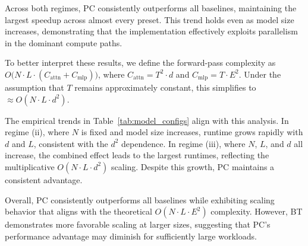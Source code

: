 Across both regimes, PC consistently outperforms all baselines, maintaining the largest speedup across almost every preset. This trend holds even as model size increases, demonstrating that the implementation effectively exploits parallelism in the dominant compute paths.

To better interpret these results, we define the forward-pass complexity as $O\bigl(N \cdot L \cdot (C_{\text{attn}} + C_{\text{mlp}})\bigr)$, where $C_{\text{attn}} = T^{2} \cdot d$ and $C_{\text{mlp}} = T \cdot E^{2}$. 
Under the assumption that $T$ remains approximately constant, this simplifies to $\approx O(N \cdot L \cdot d^{2})$.

The empirical trends in Table~\ref{tab:model_configs} align with this analysis. In regime (ii), where $N$ is fixed and model size increases, runtime grows rapidly with $d$ and $L$, consistent with the $d^{2}$ dependence. In regime (iii), where $N$, $L$, and $d$ all increase, the combined effect leads to the largest runtimes, reflecting the multiplicative $O(N \cdot L \cdot d^{2})$ scaling. Despite this growth, PC maintains a consistent advantage.

Overall, PC consistently outperforms all baselines while exhibiting scaling behavior that aligns with the theoretical $O(N \cdot L \cdot E^{2})$ complexity. However, BT demonstrates more favorable scaling at larger sizes, suggesting that PC’s performance advantage may diminish for sufficiently large workloads.
